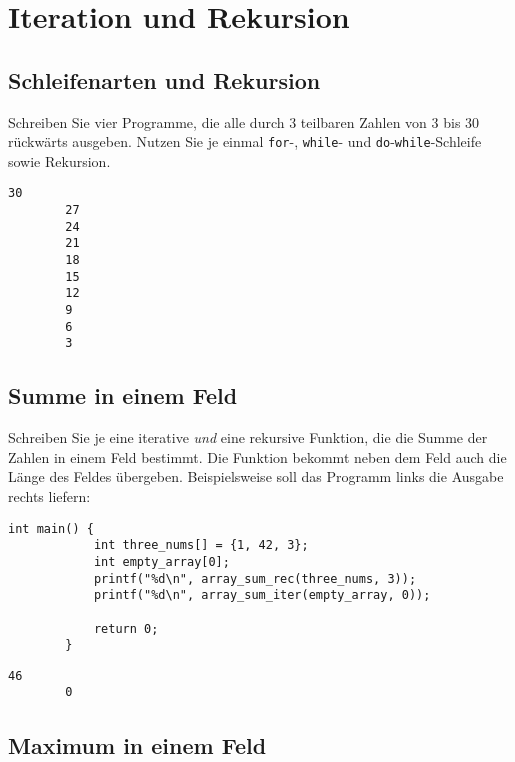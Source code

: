 \documentclass[]{article}
\begin{document}
	\section{Iteration und Rekursion}
	
	\subsection{Schleifenarten und Rekursion}
	
	Schreiben Sie vier Programme, die alle durch 3 teilbaren Zahlen von 3 bis 30 rückwärts ausgeben.
	Nutzen Sie je einmal \texttt{for}-, \texttt{while}- und \texttt{do}-\texttt{while}-Schleife sowie Rekursion.
	
	\begin{minipage}[t][][b]{0.3\linewidth}
	\begin{lstlisting}[gobble=4]
		30
		27
		24
		21
		18
		15
		12
		9
		6
		3
	\end{lstlisting}
	\end{minipage}
	
	\subsection{Summe in einem Feld}
	
	Schreiben Sie je eine iterative \emph{und} eine rekursive Funktion, die die Summe der Zahlen in einem Feld bestimmt.
	Die Funktion bekommt neben dem Feld auch die Länge des Feldes übergeben.
	Beispielsweise soll das Programm links die Ausgabe rechts liefern:
	
	\begin{minipage}[t][][b]{0.6\linewidth}
	\begin{lstlisting}[gobble=4]
		int main() {
			int three_nums[] = {1, 42, 3};
			int empty_array[0];
			printf("%d\n", array_sum_rec(three_nums, 3));
			printf("%d\n", array_sum_iter(empty_array, 0));
			  
			return 0;
		}
	\end{lstlisting}
	\end{minipage}\qquad
	\begin{minipage}[t][][b]{0.3\linewidth}
	\begin{lstlisting}[gobble=4]
		46
		0
	\end{lstlisting}
	\end{minipage}
		
	\subsection{Maximum in einem Feld}
	
\end{document}
